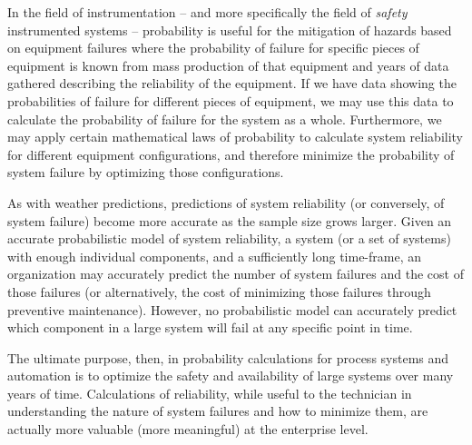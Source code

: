 In the field of instrumentation -- and more specifically the field of \textit{safety} instrumented systems -- probability is useful for the mitigation of hazards based on equipment failures where the probability of failure for specific pieces of equipment is known from mass production of that equipment and years of data gathered describing the reliability of the equipment.  If we have data showing the probabilities of failure for different pieces of equipment, we may use this data to calculate the probability of failure for the system as a whole.  Furthermore, we may apply certain mathematical laws of probability to calculate system reliability for different equipment configurations, and therefore minimize the probability of system failure by optimizing those configurations.

As with weather predictions, predictions of system reliability (or conversely, of system failure) become more accurate as the sample size grows larger.  Given an accurate probabilistic model of system reliability, a system (or a set of systems) with enough individual components, and a sufficiently long time-frame, an organization may accurately predict the number of system failures and the cost of those failures (or alternatively, the cost of minimizing those failures through preventive maintenance).  However, no probabilistic model can accurately predict which component in a large system will fail at any specific point in time.

The ultimate purpose, then, in probability calculations for process systems and automation is to optimize the safety and availability of large systems over many years of time.  Calculations of reliability, while useful to the technician in understanding the nature of system failures and how to minimize them, are actually more valuable (more meaningful) at the enterprise level.  %







